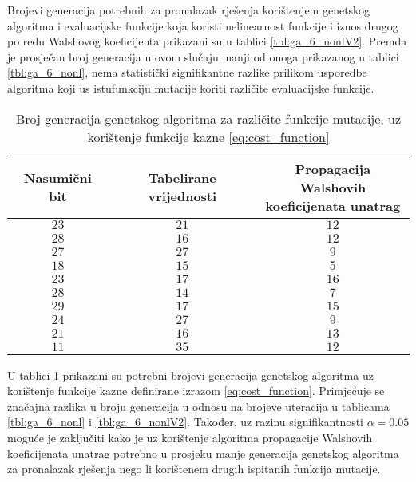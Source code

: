 Brojevi generacija potrebnih za pronalazak rješenja korištenjem genetskog algoritma i evaluacijske funkcije koja koristi nelinearnost funkcije i iznos drugog po redu Walshovog koeficijenta prikazani su u tablici \ref{tbl:ga_6_nonlV2}.
Premda je prosječan broj generacija u ovom slučaju manji od onoga prikazanog u tablici \ref{tbl:ga_6_nonl}, nema statistički signifikantne razlike prilikom usporedbe algoritma koji us istufunkciju mutacije koriti različite evaluacijske funkcije.

\begin{table}[]
    \centering
    \begin{tabular}{ccc}
        Nasumični bit & Tabelirane vrijednosti & \makecell{Propagacija Walshovih \\ koeficijenata unatrag} \\ \hline
        $23$ & $21$ & $12$ \\
        $28$ & $16$ & $12$ \\
        $27$ & $27$ &  $9$ \\
        $18$ & $15$ &  $5$ \\
        $23$ & $17$ & $16$ \\
        $28$ & $14$ &  $7$ \\
        $29$ & $17$ & $15$ \\
        $24$ & $27$ &  $9$ \\
        $21$ & $16$ & $13$ \\
        $11$ & $35$ & $12$
    \end{tabular}
    \captionsetup{justification=centering}
    \caption{Broj generacija genetskog algoritma za različite funkcije mutacije, uz korištenje funkcije kazne \eqref{eq:cost_function}}
    \label{tbl:ga_6_walshe}
\end{table}

U tablici \ref{tbl:ga_6_walshe} prikazani su potrebni brojevi generacija genetskog algoritma uz korištenje funkcije kazne definirane izrazom \eqref{eq:cost_function}.
Primjećuje se značajna razlika u broju generacija u odnosu na brojeve uteracija u tablicama \ref{tbl:ga_6_nonl} i \ref{tbl:ga_6_nonlV2}.
Također, uz razinu signifikantnosti $\alpha = 0.05$ moguće je zaključiti kako je uz korištenje algoritma propagacije Walshovih koeficijenata unatrag potrebno u prosjeku manje generacija genetskog algoritma za pronalazak rješenja nego li korištenem drugih ispitanih funkcija mutacije.

